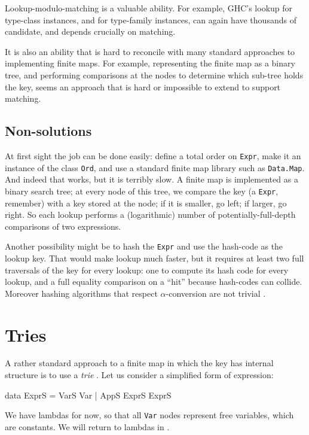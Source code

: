 \documentclass[acmsmall]{acmart}
\theoremstyle{theorem}
\theoremstyle{definition}
\theoremstyle{remark}
\begin{document}
Lookup-modulo-matching is a valuable ability.  For example, GHC's lookup for
type-class instances, and for type-family instances, can again have thousands
of candidate, and depends crucially on matching.

It is also an ability that is hard to reconcile with many standard approaches to
implementing finite maps.   For example, representing the finite map as a binary tree,
and performing comparisons at the nodes to determine which sub-tree holds the key,
seems an approach that is hard or impossible to extend to support matching.

\subsection{Non-solutions} \label{sec:ord}

At first sight the job can be done easily: define a total order on
\lstinline{Expr}, make it an instance of the class \lstinline{Ord},
and use a standard finite map library such as \lstinline{Data.Map}.
And indeed that works, but it is terribly slow.  A finite map is
implemented as a binary search tree; at every node of this tree, we compare the key (a \lstinline{Expr}, remember) with
a key stored at the node; if it is smaller, go left; if larger, go right. So each lookup
performs a (logarithmic) number of potentially-full-depth comparisons of two expressions.

Another possibility might be to hash the \lstinline{Expr} and use the
hash-code as the lookup key.  That would make lookup much faster, but
it requires at least two full traversals of the key for every lookup:
one to compute its hash code for every lookup, and a full equality
comparison on a ``hit'' because hash-codes can collide.  Moreover
hashing algorithms that respect $\alpha$-conversion are not trivial
\cite{alpha-hashing}.

\section{Tries} \label{sec:ExprS}

A rather standard approach to a finite map in which the key has internal structure
is to use a \emph{trie} \cite{trie}.  Let us consider a simplified
form of expression:
\begin{code}
data ExprS = VarS Var | AppS ExprS ExprS
\end{code}
We have lambdas for now, so that all \lstinline{Var} nodes represent free variables, which are constants.
We will return to lambdas in .
\end{document}
